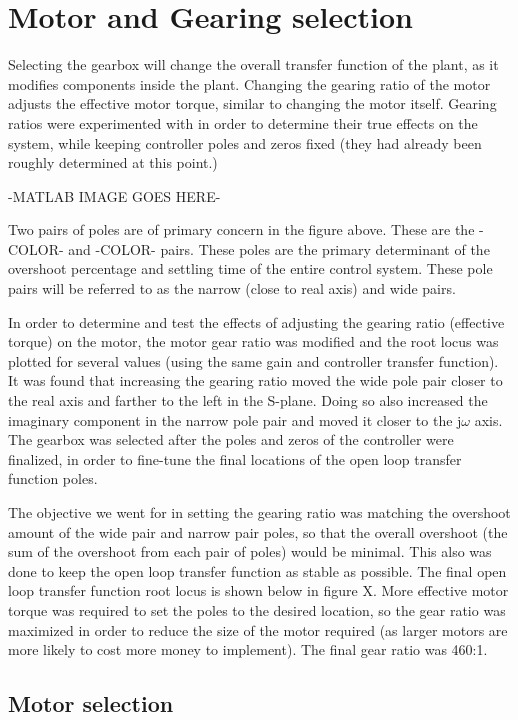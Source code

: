 \section{Motor and Gearing selection}

Selecting the gearbox will change the overall transfer function of the plant, as it modifies components inside the plant. Changing the gearing ratio of the motor adjusts the effective motor torque, similar to changing the motor itself. Gearing ratios were experimented with in order to determine their true effects on the system, while keeping controller poles and zeros fixed (they had already been roughly determined at this point.)

-MATLAB IMAGE GOES HERE-

Two pairs of poles are of primary concern in the figure above. These are the -COLOR- and -COLOR- pairs. These poles are the primary determinant of the overshoot percentage and settling time of the entire control system. These pole pairs will be referred to as the narrow (close to real axis) and wide pairs.

In order to determine and test the effects of adjusting the gearing ratio (effective torque) on the motor, the motor gear ratio was modified and the root locus was plotted for several values (using the same gain and controller transfer function). It was found that increasing the gearing ratio moved the wide pole pair closer to the real axis and farther to the left in the S-plane. Doing so also increased the imaginary component in the narrow pole pair and moved it closer to the j$\omega$ axis. The gearbox was selected after the poles and zeros of the controller were finalized, in order to fine-tune the final locations of the open loop transfer function poles.

The objective we went for in setting the gearing ratio was matching the overshoot amount of the wide pair and narrow pair poles, so that the overall overshoot (the sum of the overshoot from each pair of poles) would be minimal. This also was done to keep the open loop transfer function as stable as possible. The final open loop transfer function root locus is shown below in figure X. More effective motor torque was required to set the poles to the desired location, so the gear ratio was maximized in order to reduce the size of the motor required (as larger motors are more likely to cost more money to implement). The final gear ratio was 460:1.
\pagebreak
\subsection{Motor selection}

